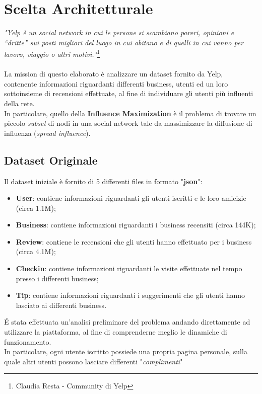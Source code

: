 
\chapter{Scelta Architetturale}
\textit{"Yelp è un social network in cui le persone si scambiano pareri, opinioni e “dritte” sui posti migliori del luogo in cui abitano e di quelli in cui vanno per lavoro, viaggio o altri motivi."}\footnote{Claudia Resta - Community di Yelp}\\\\
La mission di questo elaborato è analizzare un dataset fornito da Yelp, contenente informazioni riguardanti differenti business, utenti ed un loro sottoinsieme di recensioni effettuate, al fine di individuare gli utenti più influenti della rete.\\
In particolare, quello della \textbf{Influence Maximization} è il problema di trovare un piccolo \textit{subset} di nodi in una social network tale da  massimizzare la diffusione di influenza (\textit{spread influence}).

\section{Dataset Originale}
Il dataset iniziale è fornito di 5 differenti files in formato "\textbf{json}":
\begin{itemize}
	\item \textbf{User}: contiene informazioni riguardanti gli utenti iscritti e le loro amicizie (circa 1.1M);
	\item \textbf{Business}: contiene informazioni riguardanti i business recensiti (circa 144K);
	\item \textbf{Review}: contiene le recensioni che gli utenti hanno effettuato per i business (circa 4.1M);
	\item \textbf{Checkin}: contiene informazioni riguardanti le visite effettuate nel tempo presso i differenti business;
	\item \textbf{Tip}: contiene informazioni riguardanti i suggerimenti che gli utenti hanno lasciato ai differenti business.
\end{itemize}

\'E stata effettuata un'analisi preliminare del problema andando direttamente ad utilizzare la piattaforma, al fine di comprenderne meglio le dinamiche di funzionamento.\\
In particolare, ogni utente iscritto possiede una propria pagina personale, sulla quale altri utenti possono lasciare differenti "\textit{complimenti}"
